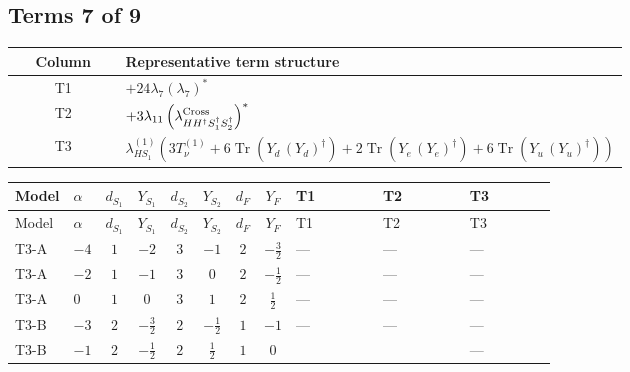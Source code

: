\documentclass[8pt]{article}
\begin{document}
\begin{landscape}
\subsection*{Terms 7 of 9}
\begin{center}
\begin{tabular}{@{}c >{\raggedright\arraybackslash}p{0.82\linewidth}@{}}
\toprule
Column & Representative term structure \\
\midrule
T1 & \(\displaystyle +24 {\lambda_{7}} \left({\lambda_{7}}\right)^{*}\) \\
\midrule
T2 & \(\displaystyle +3 {\lambda_{11}} \left({\lambda_{H H^\dagger S_1^\dagger S_2^\dagger}^{\rm Cross}}\right)^{*}\) \\
\midrule
T3 & \(\displaystyle {\lambda_{HS_1}^{(1)}} (3 T_{\nu}^{(1)}+6 \operatorname{Tr}\!\left({Y_d}\,\left({Y_d}\right)^{\dagger}\right)+2 \operatorname{Tr}\!\left({Y_e}\,\left({Y_e}\right)^{\dagger}\right)+6 \operatorname{Tr}\!\left({Y_u}\,\left({Y_u}\right)^{\dagger}\right))\) \\
\midrule
\bottomrule
\end{tabular}
\end{center}
\smallskip
\tiny
\begin{longtable}{@{}llcccccc >{\raggedright\arraybackslash}p{0.21\linewidth} >{\raggedright\arraybackslash}p{0.21\linewidth} >{\raggedright\arraybackslash}p{0.21\linewidth}@{}}
\toprule
Model & $\alpha$ & $d_{S_1}$ & $Y_{S_1}$ & $d_{S_2}$ & $Y_{S_2}$ & $d_F$ & $Y_F$ & T1 & T2 & T3 \\
\midrule
\endfirsthead
\toprule
Model & $\alpha$ & $d_{S_1}$ & $Y_{S_1}$ & $d_{S_2}$ & $Y_{S_2}$ & $d_F$ & $Y_F$ & T1 & T2 & T3 \\
\midrule
\endhead
T3-A & $-4$ & $1$ & $-2$ & $3$ & $-1$ & $2$ & $-\frac{3}{2}$ & --- & --- & --- \\
\midrule
T3-A & $-2$ & $1$ & $-1$ & $3$ & $0$ & $2$ & $-\frac{1}{2}$ & --- & --- & --- \\
\midrule
T3-A & $0$ & $1$ & $0$ & $3$ & $1$ & $2$ & $\frac{1}{2}$ & --- & --- & --- \\
\midrule
T3-B & $-3$ & $2$ & $-\frac{3}{2}$ & $2$ & $-\frac{1}{2}$ & $1$ & $-1$ & --- & --- & --- \\
\midrule
T3-B & $-1$ & $2$ & $-\frac{1}{2}$ & $2$ & $\frac{1}{2}$ & $1$ & $0$ & \scriptsize\adjustbox{max width=\linewidth}{$\begin{gathered} +24 {\lambda_{7}} \left({\lambda_{7}}\right)^{*}\end{gathered}$} & \scriptsize\adjustbox{max width=\linewidth}{$\begin{gathered} +3 {\lambda_{11}} \left({\lambda_{H H^\dagger S_1^\dagger S_2^\dagger}^{\rm Cross}}\right)^{*}\end{gathered}$} & --- \\

\end{longtable}
\end{landscape}
\end{document}
